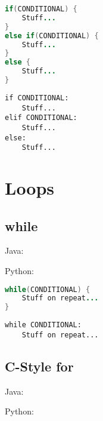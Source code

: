 \documentclass{article}
\begin{document}
\begin{minipage}{0.45\linewidth}
    \begin{lstlisting}[language=Java]
if(CONDITIONAL) {
    Stuff...
}
else if(CONDITIONAL) {
    Stuff...
}
else {
    Stuff...
}
    \end{lstlisting}
\end{minipage}
\hfill
\begin{minipage}{0.45\linewidth}
    \begin{lstlisting}
if CONDITIONAL:
    Stuff...
elif CONDITIONAL:
    Stuff...
else:
    Stuff...
    \end{lstlisting}
\end{minipage}

\section{Loops}
\subsection{while}
\begin{minipage}{0.45\linewidth}
    Java:
\end{minipage}
\hfill
\begin{minipage}{0.45\linewidth}
    Python:
\end{minipage}

\begin{minipage}{0.45\linewidth}
    \begin{lstlisting}[language=Java]
while(CONDITIONAL) {
    Stuff on repeat...
}
    \end{lstlisting}
\end{minipage}
\hfill
\begin{minipage}{0.45\linewidth}
    \begin{lstlisting}
while CONDITIONAL:
    Stuff on repeat...
    \end{lstlisting}
\end{minipage}

\subsection{C-Style for}
\begin{minipage}{0.45\linewidth}
    Java:
\end{minipage}
\hfill
\begin{minipage}{0.45\linewidth}
    Python:
\end{minipage}
\end{document}
